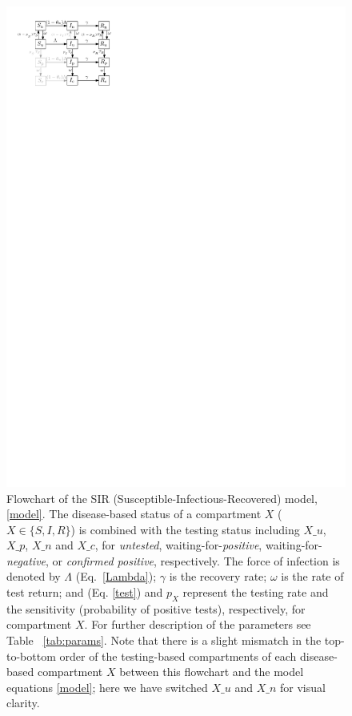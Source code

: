 \begin{figure}
\begin{center}
\includegraphics[scale=1.5]{pix/sir_comp.pdf}
\caption{\small Flowchart of the SIR (Susceptible-Infectious-Recovered) model, \ref{model}. The disease-based status of a compartment $X$ ($X \in \{S,I,R\}$) is combined with the testing status including $X\_u$, $X\_p$, $X\_n$ and $X\_c$, for \emph{untested}, waiting-for-\emph{positive}, waiting-for-\emph{negative}, or \emph{confirmed positive}, respectively. The force of infection is denoted by $\Lambda$ (Eq.~\eqref{Lambda}); $\gamma$ is the recovery rate; $\omega$ is the rate of test return; and  (Eq. \eqref{test}) and $p_X$ represent the \percap testing rate and the sensitivity (probability of positive tests), respectively, for compartment $X$. For further description of the parameters see Table~ \ref{tab:params}.
Note that there is a slight mismatch in the top-to-bottom order of the testing-based compartments of each disease-based compartment $X$ between this flowchart and the model equations \eqref{model}; here we have switched  $X\_u$ and $X\_n$ for visual clarity.
\label{fig:flowchart}}
\end{center}
\end{figure}


